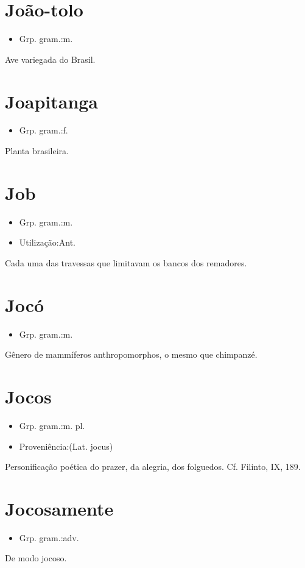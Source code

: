 \documentclass{article}
\begin{document}
\section{João-tolo}
\begin{itemize}
\item {Grp. gram.:m.}
\end{itemize}
Ave variegada do Brasil.
\section{Joapitanga}
\begin{itemize}
\item {Grp. gram.:f.}
\end{itemize}
Planta brasileira.
\section{Job}
\begin{itemize}
\item {Grp. gram.:m.}
\end{itemize}
\begin{itemize}
\item {Utilização:Ant.}
\end{itemize}
Cada uma das travessas que limitavam os bancos dos remadores.
\section{Jocó}
\begin{itemize}
\item {Grp. gram.:m.}
\end{itemize}
Gênero de mammíferos anthropomorphos, o mesmo que \textunderscore chimpanzé\textunderscore .
\section{Jocos}
\begin{itemize}
\item {Grp. gram.:m. pl.}
\end{itemize}
\begin{itemize}
\item {Proveniência:(Lat. \textunderscore jocus\textunderscore )}
\end{itemize}
Personificação poética do prazer, da alegria, dos folguedos. Cf. Filinto, IX, 189.
\section{Jocosamente}
\begin{itemize}
\item {Grp. gram.:adv.}
\end{itemize}
De modo jocoso.
\end{document}

